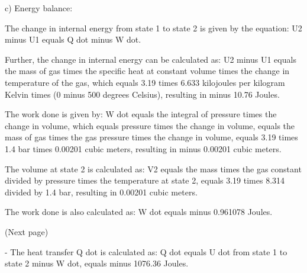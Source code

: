c) Energy balance:

The change in internal energy from state 1 to state 2 is given by the equation:
U2 minus U1 equals Q dot minus W dot.

Further, the change in internal energy can be calculated as:
U2 minus U1 equals the mass of gas times the specific heat at constant volume times the change in temperature of the gas, which equals 3.19 times 6.633 kilojoules per kilogram Kelvin times (0 minus 500 degrees Celsius), resulting in minus 10.76 Joules.

The work done is given by:
W dot equals the integral of pressure times the change in volume, which equals pressure times the change in volume, equals the mass of gas times the gas pressure times the change in volume, equals 3.19 times 1.4 bar times 0.00201 cubic meters, resulting in minus 0.00201 cubic meters.

The volume at state 2 is calculated as:
V2 equals the mass times the gas constant divided by pressure times the temperature at state 2, equals 3.19 times 8.314 divided by 1.4 bar, resulting in 0.00201 cubic meters.

The work done is also calculated as:
W dot equals minus 0.961078 Joules.

(Next page)

- The heat transfer Q dot is calculated as:
Q dot equals U dot from state 1 to state 2 minus W dot, equals minus 1076.36 Joules.